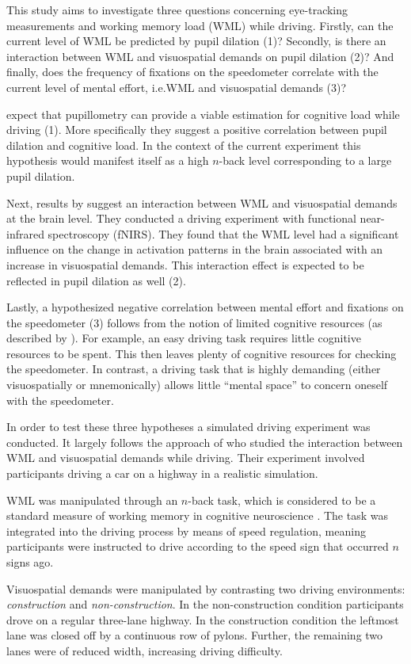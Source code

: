 This study aims to investigate three questions concerning eye-tracking measurements and working memory load (WML) while driving. 
Firstly, can the current level of WML be predicted by pupil dilation (1)? 
Secondly, is there an interaction between WML and visuospatial demands on pupil dilation (2)?
And finally, does the frequency of fixations on the speedometer correlate with the current level of mental effort, i.e.\@ WML and visuospatial demands (3)?

\citet{Palinko2010} expect that pupillometry can provide a viable estimation for cognitive load while driving (1). 
More specifically they suggest a positive correlation between pupil dilation and cognitive load.
In the context of the current experiment this hypothesis would manifest itself as a high \(n\)-back level corresponding to a large pupil dilation.

Next, results by \citet{Scheunemann2019} suggest an interaction between WML and visuospatial demands at the brain level. 
They conducted a driving experiment with functional near-infrared spectroscopy (fNIRS).
They found that the WML level had a significant influence on the change in activation patterns in the brain associated with an increase in visuospatial demands.
This interaction effect is expected to be reflected in pupil dilation as well (2).

Lastly, a hypothesized negative correlation between mental effort and fixations on the speedometer (3) follows from the notion of limited cognitive resources (as described by \citet{DeWaard1996}).
For example, an easy driving task requires little cognitive resources to be spent.
This then leaves plenty of cognitive resources for checking the speedometer.
In contrast, a driving task that is highly demanding (either visuospatially or mnemonically) allows little ``mental space'' to concern oneself with the speedometer.

In order to test these three hypotheses a simulated driving experiment was conducted.
It largely follows the approach of \citet{Scheunemann2019} who studied the interaction between WML and visuospatial demands while driving.
Their experiment involved participants driving a car on a highway in a realistic simulation. 

WML was manipulated through an \(n\)-back task, which is considered to be a standard measure of working memory in cognitive neuroscience \citep{Kane2007}.
The task was integrated into the driving process by means of speed regulation, meaning participants were instructed to drive according to the speed sign that occurred \(n\) signs ago.

Visuospatial demands were manipulated by contrasting two driving environments: \textit{construction} and \textit{non-construction}.
In the non-construction condition participants drove on a regular three-lane highway.
In the construction condition the leftmost lane was closed off by a continuous row of pylons.
Further, the remaining two lanes were of reduced width, increasing driving difficulty.